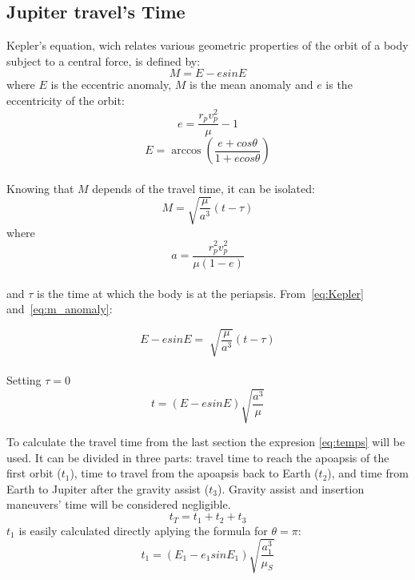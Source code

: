 

\subsection{Jupiter travel's Time}
Kepler's equation, wich relates various geometric properties of the orbit of a body subject to a central force, is defined by:
\begin{equation}\label{eq:Kepler}
M=E-esinE
\end{equation}
where $E$ is the eccentric anomaly,
$M$ is the mean anomaly and $e$ is the eccentricity of the orbit:
\begin{equation*}
e=\frac{r_pv_p^2}{\mu}-1
\end{equation*}
\begin{equation*}
E=\arccos\left(\frac{e+cos\theta}{1+ecos\theta}\right)
\end{equation*}
\\
Knowing that $M$ depends of the travel time, it can be isolated:
\begin{equation}\label{eq:m_anomaly}
M=\sqrt{\frac{\mu}{a^3}}(t-\tau)
\end{equation}
where 
\begin{equation*}
a=\frac{r_p^2v_p^2}{\mu (1-e)}
\end{equation*}
\\
and $\tau$ is the time at which the body is at the periapsis. From~\eqref{eq:Kepler} and~\eqref{eq:m_anomaly}:

\begin{equation*}\label{eq:130}
E-esinE=\sqrt[]{\frac{\mu}{a^3}}(t-\tau)
\end{equation*}
\\
Setting $\tau=0$ 
\begin{equation}\label{eq:temps}
t=(E-esinE)\sqrt{\frac{a^3}{\mu}}
\end{equation}

To calculate the travel time from the last section the expresion \eqref{eq:temps} will be used. 
It can be divided in three parts: travel time to reach the apoapsis of the first orbit ($t_1$), time to travel from the apoapsis back to Earth ($t_2$), and time from Earth to Jupiter after the gravity assist ($t_3$). Gravity assist and insertion maneuvers' time will be considered negligible.
\begin{equation*}
t_{T}=t_{1}+t_{2}+t_{3}
\end{equation*}
$t_{1}$ is easily calculated directly aplying the formula for $\theta=\pi$:
\begin{equation*}
t_1=(E_1-e_1sinE_1)\sqrt{\frac{a_1^3}{\mu_S}} %
\end{equation*}

